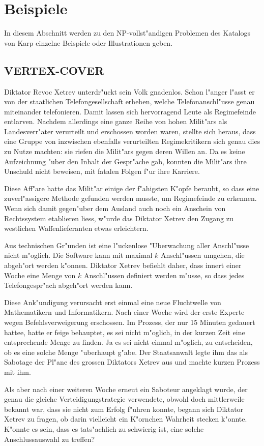 \section{Beispiele}
In diesem Abschnitt werden zu den NP-vollst"andigen Problemen des
Katalogs von Karp einzelne Beispiele oder Illustrationen geben.
\subsection{VERTEX-COVER}
Diktator Revoc Xetrev unterdr"uckt sein Volk gnadenlos.
Schon l"anger l"asst er von der staatlichen Telefongesellschaft
erheben, welche Telefonanschl"usse genau miteinander telefonieren.
Damit lassen sich hervorragend Leute als Regimefeinde entlarven.
Nachdem allerdings eine ganze Reihe von hohen Milit"ars als
Landesverr"ater verurteilt und erschossen worden waren,
stellte sich heraus, dass eine Gruppe von
inzwischen ebenfalls verurteilten Regimekritikern sich genau dies
zu Nutze machten: sie riefen die Milit"ars gegen deren Willen an.
Da es keine Aufzeichnung "uber den Inhalt der Gespr"ache gab, konnten
die Milit"ars ihre Unschuld nicht beweisen, mit fatalen Folgen f"ur
ihre Karriere.

Diese Aff"are hatte das Milit"ar einige der f"ahigsten K"opfe beraubt,
so dass eine zuverl"assigere Methode gefunden werden musste, um
Regimefeinde zu erkennen.
Wenn sich damit gegen"uber dem Ausland auch noch ein Anschein von
Rechtssystem etablieren liess, w"urde das Diktator Xetrev den Zugang
zu westlichen Waffenlieferanten etwas erleichtern.

Aus technischen Gr"unden ist eine l"uckenlose "Uberwachung aller Anschl"usse
nicht m"oglich.
Die Software kann mit maximal $k$ Anschl"ussen umgehen, die abgeh"ort
werden k"onnen.
Diktator Xetrev befiehlt daher, dass innert einer Woche eine Menge
von $k$ Anschl"ussen definiert werden m"usse, so dass jedes
Telefongespr"ach abgeh"ort werden kann.

Diese Ank"undigung verursacht erst einmal eine neue Fluchtwelle von
Mathematikern und Informatikern.
Nach einer Woche wird der erste Experte wegen Befehlsverweigerung
erschossen.
Im Prozess, der nur 15 Minuten gedauert hattee, hatte er feige behauptet,
es sei nicht m"oglich, in der kurzen
Zeit eine entsprechende Menge zu finden. Ja es sei nicht einmal
m"oglich, zu entscheiden, ob es eine solche Menge "uberhaupt g"abe.
Der Staatsanwalt legte ihm das als Sabotage der Pl"ane des grossen
Diktators Xetrev aus und machte kurzen Prozess mit ihm.

Als aber nach einer weiteren Woche erneut ein Saboteur angeklagt wurde,
der genau die gleiche Verteidigungstrategie verwendete, obwohl
doch mittlerweile bekannt war, dass sie nicht zum Erfolg f"uhren konnte,
begann sich Diktator Xetrev zu fragen, ob darin vielleicht
ein K"ornchen Wahrheit stecken k"onnte. K"onnte es sein, dass 
es tats"achlich zu schwierig ist, eine solche Anschlussauswahl zu treffen?

